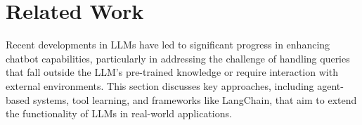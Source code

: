 \documentclass[runningheads]{llncs}
\begin{document}







\section{Related Work}
\label{section:related_work}
Recent developments in LLMs have led to significant progress in enhancing chatbot capabilities, particularly in addressing the challenge of handling queries that fall outside the LLM's pre-trained knowledge or require interaction with external environments. This section discusses key approaches, including agent-based systems, tool learning, and frameworks like LangChain, that aim to extend the functionality of LLMs in real-world applications.

\end{document}
